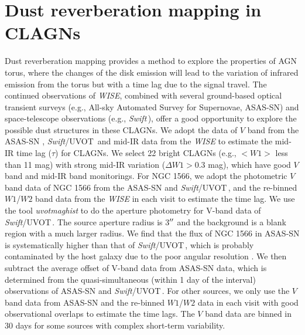 \documentclass[linenumbers]{aastex631}
\newcommand{\swift}{{\small \it Swift}}
\newcommand{\uvot}{{\small {\it Swift}/UVOT}}
\begin{document}
\section{Dust reverberation mapping in CLAGNs}\label{sec:tau-L}
Dust reverberation mapping provides a method to explore the properties of AGN torus, where the changes of the disk emission will lead to the variation of infrared emission from the torus but with a time lag due to the signal travel. The continued observations of {\it WISE}, combined with several ground-based optical transient surveys (e.g., All-sky Automated Survey for Supernovae, ASAS-SN) and space-telescope observations (e.g., \swift\,), offer a good opportunity to explore the possible dust structures in these CLAGNs. We adopt the data of $V$ band from the ASAS-SN \citep[][]{2014ApJ...788...48S,2017PASP..129j4502K,2019MNRAS.485..961J}, \uvot\, and mid-IR data from the {\it WISE} to estimate the mid-IR time lag ($\tau$) for CLAGNs. We select 22 bright CLAGNs (e.g., $<W1>$ less than 11 mag) with strong mid-IR variation ($\Delta W1>0.3$ mag), which have good $V$ band and mid-IR band monitorings. For NGC 1566, we adopt the photometric $V$ band data of NGC 1566 from the ASAS-SN and \uvot\,, and the re-binned $W1$/$W2$ band data from the {\it WISE} in each visit to estimate the time lag. We use the tool \textit{uvotmaghist} to do the aperture photometry for V-band data of \uvot\,. The source aperture radius is 3$\mbox{$^{\prime\prime}$}$ and the background is a blank region with a much larger radius. We find that the flux of NGC 1566 in ASAS-SN is systematically higher than that of \uvot\,, which is probably contaminated by the host galaxy due to the poor angular resolution \citep[see ][]{2017PASP..129j4502K}. We then subtract the average offset of V-band data from ASAS-SN data, which is determined from the quasi-simultaneous (within 1 day of the interval) observations of ASAS-SN and \uvot\,. For other sources, we only use the $V$ band data from ASAS-SN and the re-binned $W1$/$W2$ data in each visit with good observational overlaps to estimate the time lags. The $V$ band data are binned in 30 days for some sources with complex short-term variability.
\end{document}
